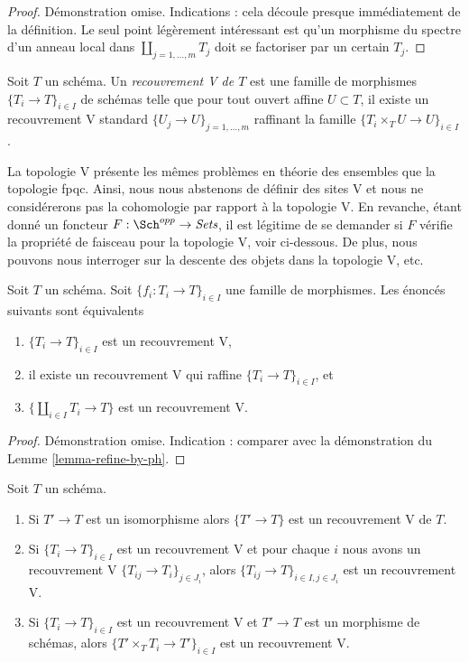 \begin{proof}
Démonstration omise. Indications : cela découle presque immédiatement de la définition. Le seul point légèrement intéressant est qu’un morphisme du spectre d’un anneau local dans $\coprod_{j = 1, \ldots, m} T_j$ doit se factoriser par un certain $T_j$.
\end{proof}

\begin{definition}
\label{definition-V-covering}
Soit $T$ un schéma. Un {\it recouvrement V de $T$} est une famille de morphismes $\{T_i \to T\}_{i \in I}$ de schémas telle que pour tout ouvert affine $U \subset T$, il existe un recouvrement V standard $\{U_j \to U\}_{j = 1, \ldots, m}$ raffinant la famille $\{T_i \times_T U \to U\}_{i \in I}$.
\end{definition}

\noindent
La topologie V présente les mêmes problèmes en théorie des ensembles que la topologie fpqc. Ainsi, nous nous abstenons de définir des sites V et nous ne considérerons pas la cohomologie par rapport à la topologie V. En revanche, étant donné un foncteur $F : \Sch^{opp} \to \textit{Sets}$, il est légitime de se demander si $F$ vérifie la propriété de faisceau pour la topologie V, voir ci-dessous. De plus, nous pouvons nous interroger sur la descente des objets dans la topologie V, etc.

\begin{lemma}
\label{lemma-refine-by-V}
Soit $T$ un schéma. Soit $\{f_i : T_i \to T\}_{i \in I}$ une famille de morphismes. Les énoncés suivants sont équivalents
\begin{enumerate}
\item $\{T_i \to T\}_{i \in I}$ est un recouvrement V,
\item il existe un recouvrement V qui raffine $\{T_i \to T\}_{i \in I}$, et
\item $\{\coprod_{i \in I} T_i \to T\}$ est un recouvrement V.
\end{enumerate}
\end{lemma}

\begin{proof}
Démonstration omise. Indication : comparer avec la démonstration du Lemme \ref{lemma-refine-by-ph}.
\end{proof}


\begin{lemma}
\label{lemma-V}
Soit $T$ un schéma.
\begin{enumerate}
\item Si $T' \to T$ est un isomorphisme alors $\{T' \to T\}$ est un recouvrement V de $T$.
\item Si $\{T_i \to T\}_{i\in I}$ est un recouvrement V et pour chaque $i$ nous avons un recouvrement V $\{T_{ij} \to T_i\}_{j\in J_i}$, alors $\{T_{ij} \to T\}_{i \in I, j\in J_i}$ est un recouvrement V.
\item Si $\{T_i \to T\}_{i\in I}$ est un recouvrement V et $T' \to T$ est un morphisme de schémas, alors $\{T' \times_T T_i \to T'\}_{i\in I}$ est un recouvrement V.
\end{enumerate}
\end{lemma}

